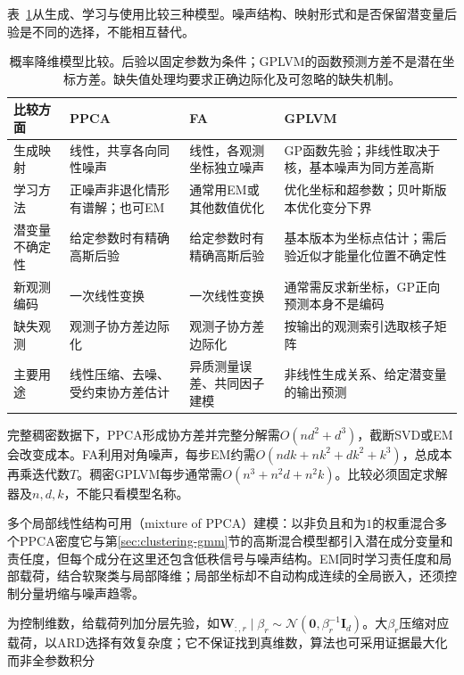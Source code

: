 表~\ref{tab:dim-probabilistic-comparison}从生成、学习与使用比较三种模型。噪声结构、映射形式和是否保留潜变量后验是不同的选择，不能相互替代。

\begin{table}[htbp]
\centering
\small
\begin{tabularx}{\linewidth}{@{}>{\RaggedRight\arraybackslash}p{20mm}>{\RaggedRight\arraybackslash}X>{\RaggedRight\arraybackslash}X>{\RaggedRight\arraybackslash}X@{}}
\toprule
比较方面 & PPCA & FA & GPLVM \\
\midrule
生成映射 & 线性，共享各向同性噪声 & 线性，各观测坐标独立噪声 & GP函数先验；非线性取决于核，基本噪声为同方差高斯 \\
学习方法 & 正噪声非退化情形有谱解；也可EM & 通常用EM或其他数值优化 & 优化坐标和超参数；贝叶斯版本优化变分下界 \\
潜变量不确定性 & 给定参数时有精确高斯后验 & 给定参数时有精确高斯后验 & 基本版本为坐标点估计；需后验近似才能量化位置不确定性 \\
新观测编码 & 一次线性变换 & 一次线性变换 & 通常需反求新坐标，GP正向预测本身不是编码 \\
缺失观测 & 观测子协方差边际化 & 观测子协方差边际化 & 按输出的观测索引选取核子矩阵 \\
主要用途 & 线性压缩、去噪、受约束协方差估计 & 异质测量误差、共同因子建模 & 非线性生成关系、给定潜变量的输出预测 \\
\bottomrule
\end{tabularx}
\caption{概率降维模型比较。后验以固定参数为条件；GPLVM的函数预测方差不是潜在坐标方差。缺失值处理均要求正确边际化及可忽略的缺失机制。}
\label{tab:dim-probabilistic-comparison}
\end{table}

完整稠密数据下，PPCA形成协方差并完整分解需$O(nd^2+d^3)$，截断SVD或EM会改变成本。FA利用对角噪声，每步EM约需$O(ndk+nk^2+dk^2+k^3)$，总成本再乘迭代数$T$。稠密GPLVM每步通常需$O(n^3+n^2d+n^2k)$。比较必须固定求解器及$n,d,k$，不能只看模型名称。

多个局部线性结构可用（mixture of PPCA）建模：以非负且和为$1$的权重混合多个PPCA密度它与第\ref{sec:clustering-gmm}节的高斯混合模型都引入潜在成分变量和责任度，但每个成分在这里还包含低秩信号与噪声结构。EM同时学习责任度和局部载荷，结合软聚类与局部降维；局部坐标却不自动构成连续的全局嵌入，还须控制分量坍缩与噪声趋零。

为控制维数，给载荷列加分层先验，如$\bm{W}_{:,r}\mid\beta_r\sim\mathcal{N}(\bm{0},\beta_r^{-1}\bm{I}_d)$。大$\beta_r$压缩对应载荷，以ARD选择有效复杂度；它不保证找到真维数，算法也可采用证据最大化而非全参数积分

